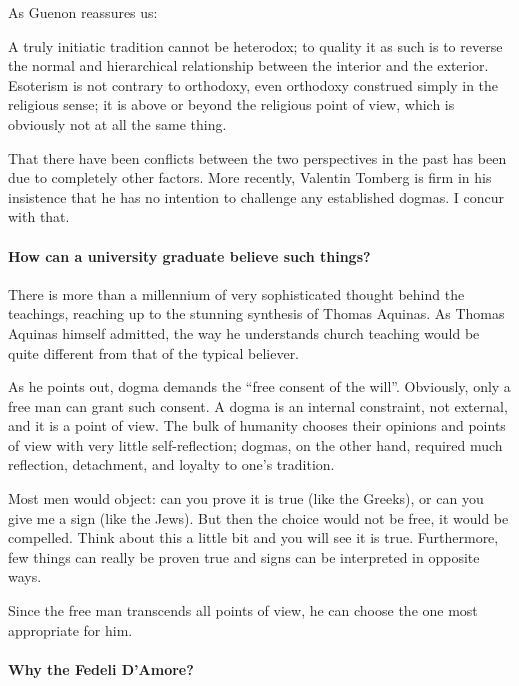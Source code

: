 As Guenon reassures us:

\begin{quotex}
A truly initiatic tradition cannot be heterodox; to quality it as such is to reverse the normal and hierarchical relationship between the interior and the exterior. Esoterism is not contrary to orthodoxy, even orthodoxy construed simply in the religious sense; it is above or beyond the religious point of view, which is obviously not at all the same thing.
\end{quotex}


That there have been conflicts between the two perspectives in the past has been due to completely other factors. More recently, Valentin Tomberg is firm in his insistence that he has no intention to challenge any established dogmas. I concur with that.

\paragraph{How can a university graduate believe such things?}


There is more than a millennium of very sophisticated thought behind the teachings, reaching up to the stunning synthesis of Thomas Aquinas. As Thomas Aquinas himself admitted, the way he understands church teaching would be quite different from that of the typical believer.

As he points out, dogma demands the ``free consent of the will''. Obviously, only a free man can grant such consent. A dogma is an internal constraint, not external, and it is a point of view. The bulk of humanity chooses their opinions and points of view with very little self-reflection; dogmas, on the other hand, required much reflection, detachment, and loyalty to one's tradition.

Most men would object: can you prove it is true (like the Greeks), or can you give me a sign (like the Jews). But then the choice would not be free, it would be compelled. Think about this a little bit and you will see it is true. Furthermore, few things can really be proven true and signs can be interpreted in opposite ways.

Since the free man transcends all points of view, he can choose the one most appropriate for him.

\paragraph{Why the Fedeli D'Amore?}



